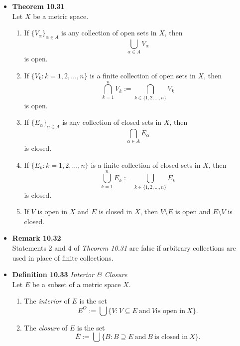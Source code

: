 \documentclass[11pt,a4paper]{article}
\begin{document}
\begin{itemize}
    \item \textbf{Theorem 10.31} \\
        Let $X$ be a metric space.
        \begin{enumerate}
            \item If ${\{V_\alpha\}}_{\alpha \in A}$ is any collection of open sets in $X$,
                then
                \[
                    \bigcup_{\alpha \in A} V_\alpha
                \]
                is open.

            \item If $\{V_k : k = 1, 2, \ldots, n\}$ is a finite collection of open sets in
                $X$, then
                \[
                    \bigcap_{k=1}^n V_k := \bigcap_{k \in \{1, 2, \ldots, n\}} V_k
                \]
                is open.

            \item If ${\{E_\alpha\}}_{\alpha \in A}$ is any collection of closed sets in $X$,
                then
                \[
                    \bigcap_{\alpha \in A} E_\alpha
                \]
                is closed.

            \item If $\{E_k : k = 1, 2, \ldots, n\}$ is a finite collection of closed sets in
                $X$, then
                \[
                    \bigcup_{k=1}^n E_k := \bigcup_{k \in \{1, 2, \ldots, n\}} E_k
                \]
                is closed.

            \item If $V$ is open in $X$ and $E$ is closed in $X$, then $V \setminus E$
                is open and $E \setminus V$ is closed.

        \end{enumerate}

    \item \textbf{Remark 10.32} \\
        Statements 2 and 4 of \emph{Theorem 10.31} are false if arbitrary collections are used
        in place of finite collections.

    \item \textbf{Definition 10.33} \emph{Interior \& Closure} \\
        Let $E$ be a subset of a metric space $X$.
        \begin{enumerate}
            \item The \emph{interior} of $E$ is the set
                \[
                    E^O := \bigcup \{ V : V \subseteq E \
                    \text{and} \ V \text{is open in} \ X\}.
                \]
            \item The \emph{closure} of $E$ is the set
                \[
                    \overline{E} := \bigcup \{ B : B \supseteq E \
                    \text{and} \ B \ \text{is closed in} \ X\}.
                \]
        \end{enumerate}


\end{itemize}
\end{document}
